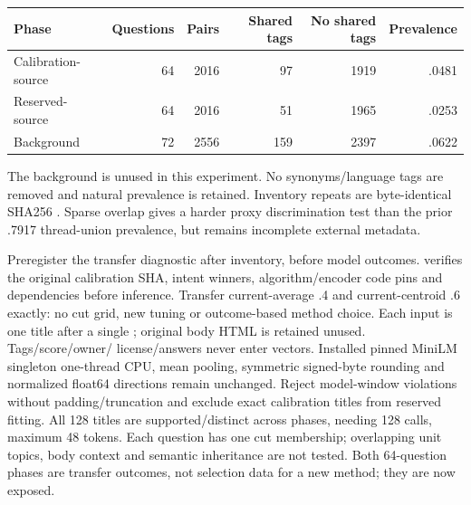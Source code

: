 \documentclass[11pt]{article}
\begin{document}
\begin{center}
\begin{tabular}{lrrrrr}
\toprule
Phase & Questions & Pairs & Shared tags & No shared tags & Prevalence \\
\midrule
Calibration-source & 64 & 2016 & 97 & 1919 & .0481 \\
Reserved-source & 64 & 2016 & 51 & 1965 & .0253 \\
Background & 72 & 2556 & 159 & 2397 & .0622 \\
\bottomrule
\end{tabular}
\end{center}
The background is unused in this experiment. No synonyms/language tags are
removed and natural prevalence is retained. Inventory repeats are byte-identical
SHA256 .
Sparse overlap gives a harder proxy discrimination test than the prior .7917
thread-union prevalence, but remains incomplete external metadata.

Preregister the transfer diagnostic after inventory, before model outcomes.
 verifies the original calibration SHA, intent
winners, algorithm/encoder code pins and dependencies before inference.
Transfer current-average .4 and current-centroid .6 exactly: no cut grid,
new tuning or outcome-based method choice. Each input is one title after a single
; original body HTML is retained unused. Tags/score/owner/
license/answers never enter vectors. Installed pinned MiniLM singleton one-thread
CPU, mean pooling, symmetric signed-byte rounding and normalized float64
directions remain unchanged. Reject model-window violations without
padding/truncation and exclude exact calibration titles from reserved fitting.
All 128 titles are supported/distinct across phases, needing 128 calls, maximum 48
tokens. Each question has one cut membership; overlapping unit topics, body
context and semantic inheritance are not tested. Both 64-question phases are
transfer outcomes, not selection data for a new method; they are now exposed.
\end{document}
